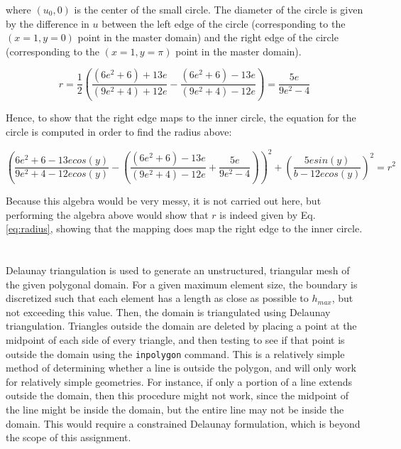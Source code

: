\documentclass[10pt]{article}
\begin{document}
where \((u_0,0)\) is the center of the small circle. The diameter of the circle is given by the difference in \(u\) between the left edge of the circle (corresponding to the \((x=1,y=0)\) point in the master domain) and the right edge of the circle (corresponding to the \((x=1,y=\pi)\) point in the master domain). 

\begin{equation}
\label{eq:radius}
r=\frac{1}{2}\left(\frac{(6e^{2}+6)+13e}{(9e^{2}+4)+12e}-\frac{(6e^{2}+6)-13e}{(9e^{2}+4)-12e}\right)=\frac{5e}{9e^2-4}
\end{equation}

Hence, to show that the right edge maps to the inner circle, the equation for the circle is computed in order to find the radius above:

\begin{equation}
\left(\frac{6e^{2}+6-13ecos(y)}{9e^{2}+4-12ecos(y)}-\left(\frac{(6e^{2}+6)-13e}{(9e^{2}+4)-12e}+\frac{5e}{9e^2-4}\right)\right)^2+\left(\frac{5esin(y)}{b-12ecos(y)}\right)^2=r^2
\end{equation}

Because this algebra would be very messy, it is not carried out here, but performing the algebra above would show that \(r\) is indeed given by Eq. \eqref{eq:radius}, showing that the mapping does map the right edge to the inner circle.

\section{}

Delaunay triangulation is used to generate an unstructured, triangular mesh of the given polygonal domain. For a given maximum element size, the boundary is discretized such that each element has a length as close as possible to \(h_{max}\), but not exceeding this value. Then, the domain is triangulated using Delaunay triangulation. Triangles outside the domain are deleted by placing a point at the midpoint of each side of every triangle, and then testing to see if that point is outside the domain using the {\tt inpolygon} command. This is a relatively simple method of determining whether a line is outside the polygon, and will only work for relatively simple geometries. For instance, if only a portion of a line extends outside the domain, then this procedure might not work, since the midpoint of the line might be inside the domain, but the entire line may not be inside the domain. This would require a constrained Delaunay formulation, which is beyond the scope of this assignment. 
\end{document}
